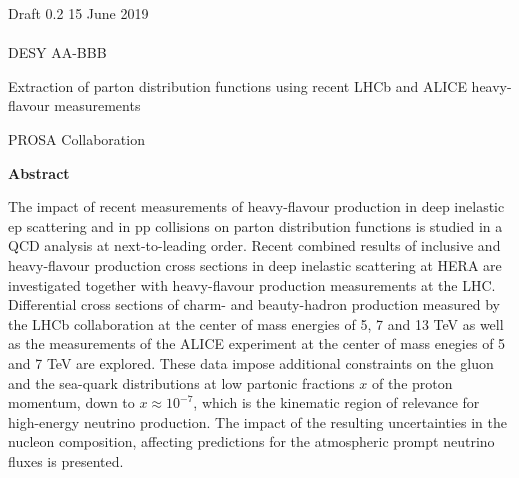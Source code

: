 \documentclass[12pt]{article}
\begin{document}
\begin{titlepage}
\noindent
Draft 0.2  \hfill 15 June 2019\\
\\
DESY AA-BBB %
\\

\vspace{1.3cm}

\begin{center}
  {\bf 

\large

Extraction of parton distribution functions using recent LHCb and ALICE heavy-flavour measurements
  }
  \vspace{1.5cm}

  {\large
    PROSA Collaboration
  }\\

  \vspace{1.2cm}

\end{center}
  \vspace{2.4cm}
\begin{center}
\large
{\bf Abstract}
\vspace{-0.2cm}
\end{center}
The impact of recent measurements of heavy-flavour production in deep inelastic ep scattering and
in pp collisions on parton distribution functions is studied in a QCD analysis at next-to-leading order. 
Recent combined results of inclusive and heavy-flavour production cross sections in deep inelastic scattering at HERA are 
investigated together with heavy-flavour production measurements at the LHC. Differential cross sections of charm- and 
beauty-hadron production measured by the LHCb collaboration at the center of mass energies of 5, 7 and 13 TeV as well 
as the measurements of the ALICE experiment at the center of mass enegies of 5 and 7 TeV are explored. 
These data impose additional constraints on the gluon and the sea-quark distributions at low partonic fractions
$x$ of the proton momentum, down to $x\approx10^{-7}$, which is the kinematic region of relevance for high-energy 
neutrino production. The impact of the resulting uncertainties in the nucleon composition, affecting predictions for 
the atmospheric prompt neutrino fluxes is presented.

\vfill
\end{titlepage}


%
%
\newpage
\end{document}
